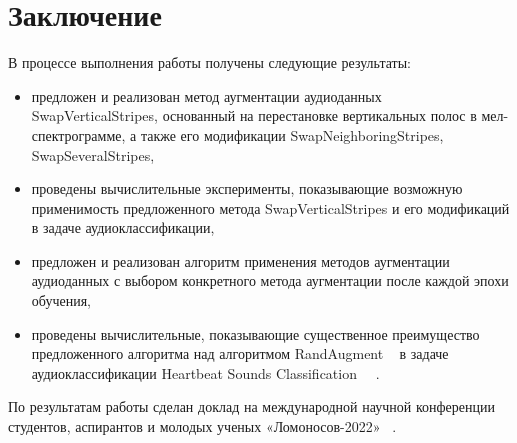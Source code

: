 \documentclass[12pt, fleqn]{article}
\begin{document}
\section{Заключение}

В процессе выполнения работы получены следующие результаты:

\begin{itemize}
    \item предложен и реализован метод аугментации аудиоданных SwapVerticalStripes, основанный на перестановке вертикальных полос в мел-спектрограмме, а также его модификации SwapNeighboringStripes, SwapSeveralStripes,
    \item проведены вычислительные эксперименты, показывающие возможную применимость предложенного метода SwapVerticalStripes и его модификаций в задаче аудиоклассификации,
    \item предложен и реализован алгоритм применения методов аугментации аудиоданных с выбором конкретного метода аугментации после каждой эпохи обучения,
    \item проведены вычислительные, показывающие существенное преимущество предложенного алгоритма над алгоритмом RandAugment ~\cite{RandAugment} в задаче аудиоклассификации Heartbeat Sounds Classification ~\cite{HeartbeatSoundsArticle}~\cite{HeartbeatSoundsKaggle}.
\end{itemize}

По результатам работы сделан доклад на международной научной конференции
студентов, аспирантов и молодых ученых «Ломоносов-2022» ~\cite{Lomonosov}.
\end{document}
